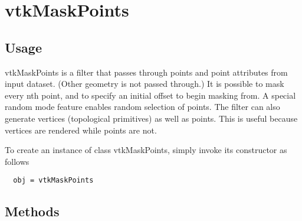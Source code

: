 \section{vtkMaskPoints}

\subsection{Usage}

 vtkMaskPoints is a filter that passes through points and point attributes 
 from input dataset. (Other geometry is not passed through.) It is 
 possible to mask every nth point, and to specify an initial offset
 to begin masking from. A special random mode feature enables random 
 selection of points. The filter can also generate vertices (topological
 primitives) as well as points. This is useful because vertices are
 rendered while points are not.

To create an instance of class vtkMaskPoints, simply
invoke its constructor as follows
\begin{verbatim}
  obj = vtkMaskPoints
\end{verbatim}
\subsection{Methods}

